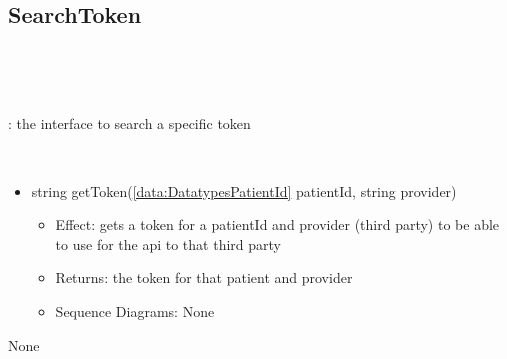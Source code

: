   \subsection{SearchToken}\label{int:InterfacesSearchToken}
    \begin{description}
      \item[Provided by:] \iconcomponent{}~
      \item[Required by:] \iconcomponent{}~ 
           \item[Description]: the interface to search a specific token
      \item[Operations:] ~
    \begin{itemize}[noitemsep,nolistsep,leftmargin=-.25cm]
      \item \textsf{string getToken(\ref{data:DatatypesPatientId} patientId, string provider)}
        \begin{itemize}[noitemsep,nolistsep]
           \item Effect: gets a token for a patientId and provider (third party) to be able to use for the api to that third party 
           \item Returns: the token for that patient and provider
           \item Sequence Diagrams: None
        \end{itemize}
    \end{itemize}
      \item[Diagrams:] None
    \end{description}

